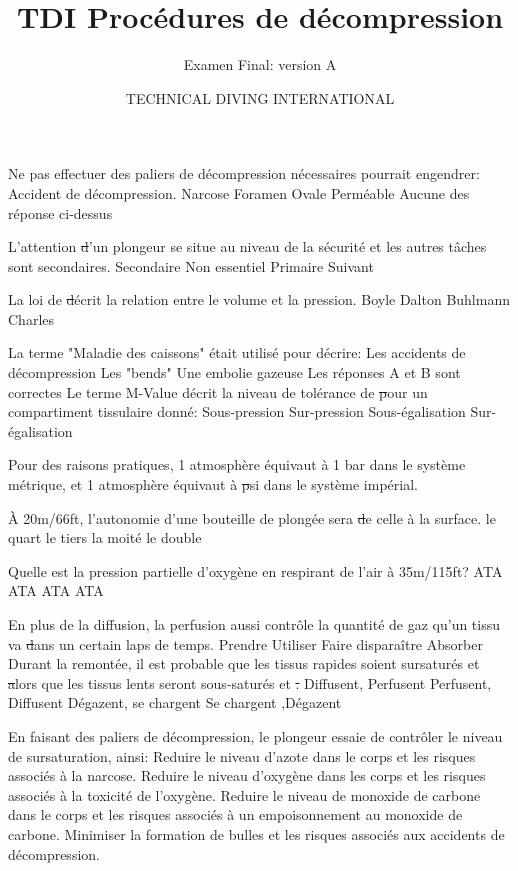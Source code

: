 \documentclass[english,10pt,twoside]{article}
\title{TDI Procédures de décompression}
\subtitle{Examen Final: version A}
\author{TECHNICAL DIVING INTERNATIONAL}
\begin{document}
\sloppy


	\begin{outline}
		\1 Ne pas effectuer des paliers de décompression nécessaires pourrait engendrer:
			\2 Accident de décompression.
			\2 Narcose
			\2 Foramen Ovale Perméable
			\2 Aucune des réponse ci-dessus

		\1 L'attention \st d'un plongeur se situe au niveau de la sécurité et les autres tâches sont secondaires.
			\2 Secondaire
			\2 Non essentiel
			\2 Primaire
			\2 Suivant

		\1 La loi de \st décrit la relation entre le volume et la pression.
			\2 Boyle
			\2 Dalton
			\2 Buhlmann
			\2 Charles

		\1 La terme "Maladie des caissons" était utilisé pour décrire:
			\2 Les accidents de décompression
			\2 Les "bends"
			\2 Une embolie gazeuse
			\2 Les réponses A et B sont correctes
		\1 Le terme M-Value décrit la niveau de tolérance de \st pour un compartiment tissulaire donné:
			\2 Sous-pression
			\2 Sur-pression
			\2 Sous-égalisation
			\2 Sur-égalisation

		\1 Pour des raisons pratiques, 1 atmosphère équivaut à 1 bar dans le système métrique, et 1 atmosphère équivaut à \st psi dans le système impérial.

		\1 À 20m/66ft, l'autonomie d'une bouteille de plongée sera \st de celle à la surface.
			\2 le quart
			\2 le tiers
			\2 la moité
			\2 le double

		\1 Quelle est la pression partielle d'oxygène en respirant de l'air à 35m/115ft?
			 ATA
			 ATA
			 ATA
			 ATA

		\1 En plus de la diffusion, la perfusion aussi contrôle la quantité de gaz qu'un tissu va \st dans un certain laps de temps.
			\2 Prendre
			\2 Utiliser
			\2 Faire disparaître
			\2 Absorber
		\1 Durant la remontée, il est probable que les tissus rapides soient sursaturés et \st alors que les tissus lents seront sous-saturés et \st.
			\2 Diffusent, Perfusent
			\2 Perfusent, Diffusent
			\2 Dégazent, se chargent
			\2 Se chargent ,Dégazent

		\1 En faisant des paliers de décompression, le plongeur essaie de contrôler le niveau de sursaturation, ainsi:
			\2 Reduire le niveau d'azote dans le corps et les risques associés à la narcose.
			\2 Reduire le niveau d'oxygène dans les corps et les risques associés à la toxicité de l'oxygène.
			\2 Reduire le niveau de monoxide de carbone dans le corps et les risques associés à un empoisonnement au monoxide de carbone.
			\2 Minimiser la formation de bulles et les risques associés aux accidents de décompression.


\end{outline}
\end{document}
